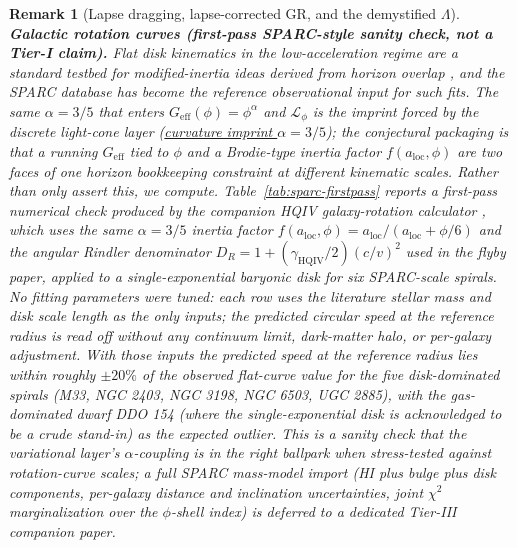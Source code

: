 \documentclass[11pt]{amsart}
\newtheorem{remark}[theorem]{Remark}
\begin{document}
\begin{remark}[\texorpdfstring{Lapse dragging, lapse-corrected GR, and the demystified $\Lambda$}{Lapse dragging, lapse-corrected GR, and demystified Lambda}]
\medskip
\noindent\textbf{Galactic rotation curves (first-pass SPARC-style sanity check, not a Tier-I claim).}
Flat disk kinematics in the low-acceleration regime are a standard testbed for modified-inertia ideas derived from horizon overlap \cite{brodie2026}, and the SPARC database \cite{lelli2016sparc} has become the reference observational input for such fits. The same \(\alpha=3/5\) that enters \(G_{\mathrm{eff}}(\phi)=\phi^{\alpha}\) and \(\mathcal{L}_\phi\) is the imprint forced by the discrete light-cone layer (\hyperref[lean:imprint-alpha]{curvature imprint \(\alpha=3/5\)}); the \emph{conjectural} packaging is that a running \(G_{\mathrm{eff}}\) tied to \(\phi\) and a Brodie-type inertia factor \(f(a_{\mathrm{loc}},\phi)\) are two faces of one horizon bookkeeping constraint at different kinematic scales. Rather than only assert this, we compute. Table~\ref{tab:sparc-firstpass} reports a first-pass numerical check produced by the companion HQIV galaxy-rotation calculator \cite{hqiv-orbital}, which uses the same \(\alpha=3/5\) inertia factor \(f(a_{\mathrm{loc}},\phi)=a_{\mathrm{loc}}/(a_{\mathrm{loc}}+\phi/6)\) and the angular Rindler denominator \(D_R=1+(\gamma_{\mathrm{HQIV}}/2)(c/v)^{2}\) used in the flyby paper, applied to a single-exponential baryonic disk for six SPARC-scale spirals. \emph{No fitting parameters were tuned}: each row uses the literature stellar mass and disk scale length as the only inputs; the predicted circular speed at the reference radius is read off without any continuum limit, dark-matter halo, or per-galaxy adjustment. With those inputs the predicted speed at the reference radius lies within roughly \(\pm 20\%\) of the observed flat-curve value for the five disk-dominated spirals (M33, NGC 2403, NGC 3198, NGC 6503, UGC 2885), with the gas-dominated dwarf DDO 154 (where the single-exponential disk is acknowledged to be a crude stand-in) as the expected outlier. This is a sanity check that the variational layer's \(\alpha\)-coupling is in the right ballpark when stress-tested against rotation-curve scales; a full SPARC mass-model import (HI plus bulge plus disk components, per-galaxy distance and inclination uncertainties, joint \(\chi^{2}\) marginalization over the \(\phi\)-shell index) is deferred to a dedicated Tier-III companion paper.
\end{remark}
\end{document}
